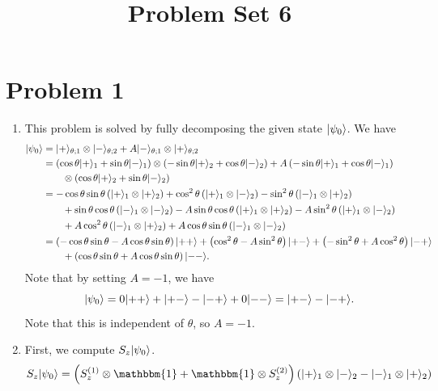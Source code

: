 \documentclass[11pt, letterpaper]{article}
\title{Problem Set 6}
\begin{document}
\makeproblem
\section*{Problem 1}
\begin{enumerate}
	\item This problem is solved by fully decomposing the given state $\lvert\psi _0\rangle $. We have
		\begin{align*}
			\lvert\psi _0\rangle &=\lvert+\rangle_{\theta ;1} \otimes \lvert-\rangle_{\theta ;2} +A\lvert-\rangle_{\theta ;1} \otimes \lvert+\rangle_{\theta ;2} \\
				      &=\left( \cos \theta \lvert+\rangle_1+\sin \theta \lvert-\rangle_1 \right) \otimes \left( -\sin \theta \lvert+\rangle_2+\cos \theta \lvert-\rangle_2 \right) +A\left( -\sin \theta \lvert+\rangle_1 + \cos \theta \lvert-\rangle_1 \right) \\
				      &\qquad\otimes \left( \cos \theta \lvert+\rangle_2+\sin \theta \lvert-\rangle _2 \right) \\
				      &=-\cos \theta \sin \theta \left( \lvert+\rangle_1 \otimes \lvert+\rangle_2 \right) +\cos ^2\theta \left( \lvert+\rangle _1\otimes \lvert-\rangle _2 \right) -\sin ^2\theta \left( \lvert-\rangle_1\otimes \lvert+\rangle _2 \right) \\
				      &\qquad +\sin \theta \cos \theta \left( \lvert-\rangle _1\otimes \lvert-\rangle _2 \right) -A \sin \theta \cos \theta \left( \lvert+\rangle _1\otimes \lvert+\rangle _2 \right) -A \sin^2 \theta \left( \lvert+\rangle_1 \otimes \lvert-\rangle_2 \right)\\
				      &\qquad +A\cos ^2\theta \left( \lvert-\rangle _1\otimes \lvert+\rangle _2 \right) +A\cos \theta \sin \theta \left( \lvert-\rangle _1 \otimes \lvert-\rangle _2 \right) \\
				      &=\left( -\cos \theta \sin \theta -A \cos \theta \sin \theta  \right) \lvert++\rangle+\left( \cos ^2\theta -A \sin ^2\theta  \right) \lvert+-\rangle +\left( -\sin ^2\theta +A\cos ^2\theta  \right) \lvert-+\rangle \\
				      &\qquad +\left( \cos \theta \sin \theta  +A \cos \theta \sin \theta  \right) \lvert- -\rangle
		.\end{align*}
		Note that by setting $A=-1$, we have
		\[
			\lvert\psi _0\rangle =0\lvert++\rangle +\lvert+-\rangle -\lvert-+\rangle +0\lvert- - \rangle =\lvert+-\rangle -\lvert-+\rangle 
		.\]
		Note that this is independent of $\theta $, so $A=-1$.
	\item First, we compute $S_z\lvert\psi _0\rangle $.
		\begin{align*}
			S_z\ket{\psi _0} &=\left( S_z^{(1)} \otimes \mathbbm{1}+\mathbbm{1}\otimes S_z^{(2)}   \right) \left( \ket{+}_1 \otimes \ket{-} _2-\ket{-} _1\otimes \ket{+} _2 \right)\\

\end{align*}
\end{enumerate}
\end{document}
